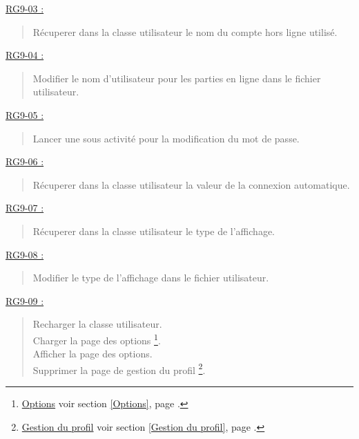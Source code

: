 \documentclass{report}
\begin{document}
				
			\underline{RG9-03 :}
				\begin{quote}
					Récuperer dans la classe utilisateur le nom du compte hors ligne utilisé.\\
				\end{quote}		


			\underline{RG9-04 :}
				\begin{quote}
					Modifier le nom d'utilisateur pour les parties en ligne dans le fichier utilisateur.\\
				\end{quote}
				

			\underline{RG9-05 :}
				\begin{quote}
					Lancer une sous activité pour la modification du mot de passe.\\
				\end{quote}


			\underline{RG9-06 :}
				\begin{quote}
					Récuperer dans la classe utilisateur la valeur de la connexion automatique.\\
				\end{quote}
			 

			\underline{RG9-07 :}
				\begin{quote}
					Récuperer dans la classe utilisateur le type de l'affichage.\\
				\end{quote}


			\underline{RG9-08 :}
				\begin{quote}
					Modifier le type de l'affichage dans le fichier utilisateur.\\
				\end{quote}		
				
				
			\underline{RG9-09 :}
				\begin{quote}
					Recharger la classe utilisateur.\\
					Charger la page des options%
						\footnote[1]{
							\hyperlink{Options}{Options}
							\og voir section \ref{Options}, page \pageref{Options}.\fg
						}.\\
					Afficher la page des options\footnotemark[1].\\
					Supprimer la page de gestion du profil%
						\footnote[2]{
							\hyperlink{Gestion du profil}{Gestion du profil}
							\og voir section \ref{Gestion du profil}, page \pageref{Gestion du profil}.\fg
						}.\\
				\end{quote}
				
\end{document}
